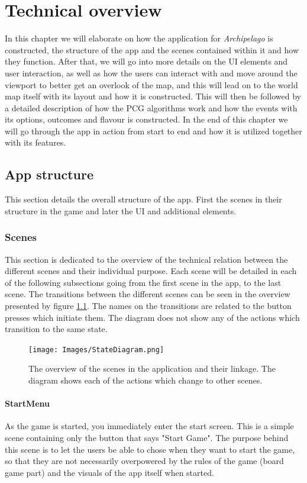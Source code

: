 \chapter{Technical overview}
In this chapter we will elaborate on how the application for \textit{Archipelago} is constructed, the structure of the app and the scenes contained within it and how they function. After that, we will go into more details on the UI elements and user interaction, as well as how the users can interact with and move around the viewport to better get an overlook of the map, and this will lead on to the world map itself with its layout and how it is constructed. This will then be followed by a detailed description of how the PCG algorithms work and how the events with its options, outcomes and flavour is constructed. In the end of this chapter we will go through the app in action from start to end and how it is utilized together with its features.

\section{App structure}
This section details the overall structure of the app.
First the scenes in their structure in the game and later the UI and additional elements.

\subsection{Scenes}
\label{sec:scen}
This section is dedicated to the overview of the technical relation between the different scenes and their individual purpose. Each scene will be detailed in each of the following subsections going from the first scene in the app, to the last scene.
The transitions between the different scenes can be seen in the overview presented by figure \ref{fig:appState}. The names on the transitions are related to the button presses which initiate them. 
The diagram does not show any of the actions which transition to the same state.

\begin{figure}[!ht]
    \centering
    \texttt{[image: Images/StateDiagram.png]}
    \caption{The overview of the scenes in the application and their linkage. The diagram shows each of the actions which change to other scenes.}
    \label{fig:appState}
\end{figure}

\subsubsection{StartMenu}
As the game is started, you immediately enter the start screen. This is a simple scene containing only the button that says "Start Game". The purpose behind this scene is to let the users be able to chose when they want to start the game, so that they are not necessarily overpowered by the rules of the game (board game part) and the visuals of the app itself when started.


